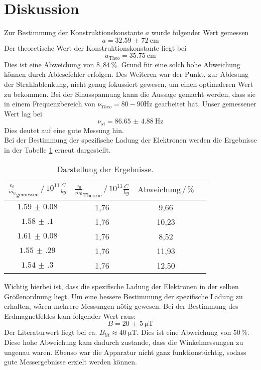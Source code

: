 \section{Diskussion}
Zur Bestimmung der Konstruktionskonstante $a$ wurde
folgender Wert gemessen
\begin{equation*}
    a = \SI{32,59(72)}{\centi\meter}
\end{equation*}
Der theoretische Wert der Konstruktionskonstante liegt bei
\begin{equation*}
   a_{\text{Theo}} = \SI{35.75}{\centi\meter}
\end{equation*}
Dies ist eine Abweichung von $8,84 \, \%$. Grund für eine solch hohe Abweichung
können durch Ablesefehler erfolgen. Des Weiteren war der Punkt, zur Ablesung der
Strahlablenkung, nicht genug fokussiert gewesen, um einen optimaleren Wert zu bekommen.
Bei der Sinusspannung kann die Aussage gemacht werden, dass sie in einem Frequenzbereich
von $\nu_{Theo}=80 - 90 \si{\hertz}$ gearbeitet hat.
Unser gemessener Wert lag bei
\begin{equation*}
  \nu_{si}= \SI{86.65(488)}{\hertz}
\end{equation*}
Dies deutet auf eine gute Messung hin.\\
Bei der Bestimmung der spezifische Ladung der Elektronen werden die Ergebnisse in der Tabelle \ref{tab:8}
erneut dargestellt.
\begin{table}[H]
  \centering
  \caption{Darstellung der Ergebnisse.}
  \label{tab:8}
  \begin{tabular}{c c c c}
\toprule
$\frac{e_0}{m_0}_{\text{gemessen}}\,/\, 10^{11}\frac{C}{kg}$ & $\frac{e_0}{m_0}_{\text{Theorie}} \,/\, 10^{11}\frac{C}{kg}$& $\text{Abweichung} \,/\, \%$\\
\midrule
$\num{1.59(8)}$ &1,76 &  9,66\\
$\num{1.58(10)}$&1,76 & 10,23\\
$\num{1.61(8)}$ &1,76 &  8,52\\
$\num{1.55(29)}$&1,76 & 11,93\\
$\num{1.54(30)}$&1,76 & 12,50\\
\bottomrule
  \end{tabular}
\end{table}
Wichtig hierbei ist, dass die spezifische Ladung der Elektronen in der selben Größenordnung liegt. Um eine bessere
Bestimmung der spezifische Ladung zu erhalten, wären mehrere Messungen nötig gewesen.
Bei der Bestimmung des Erdmagnetfeldes kam folgender Wert raus:
\begin{equation*}
  B= \SI{20(5)}{\micro\tesla}
\end{equation*}
Der Literaturwert \cite{3} liegt bei ca. $B_{lit} \approx \SI{40}{\micro\tesla}$.
Dies ist eine Abweichung von $50 \, \%$. Diese hohe Abweichung kam dadurch zustande, dass die Winkelmessungen
zu ungenau waren. Ebenso war die Apparatur nicht ganz funktionstüchtig, sodass gute Messergebnisse erzielt werden
können.
